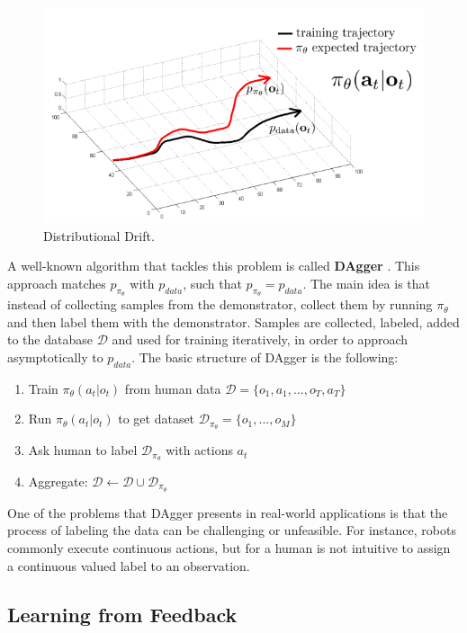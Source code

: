 \begin{figure}[H]
    \centering
    \includegraphics[width=0.7\linewidth]{imagenes/cap1/drift.png}
    \caption{Distributional Drift.\protect\footnotemark}
    \label{fig:drift}
\end{figure}

A well-known algorithm that tackles this problem is called \textbf{DAgger} \cite{ross2011reduction}. This approach matches $p_{\pi_{\theta}}$ with $p_{data}$, such that $p_{\pi_{\theta}} = p_{data}$. The main idea is that instead of collecting samples from the demonstrator, collect them by running $\pi_{\theta}$ and then label them with the demonstrator. Samples are collected, labeled, added to the database $\mathcal{D}$ and used for training iteratively, in order to approach asymptotically to $p_{data}$. The basic structure of DAgger is the following:

\begin{enumerate}
    \item Train $\pi_{\theta}(a_{t}|o_{t})$ from human data $\mathcal{D}=\{o_{1},a_{1},...,o_{T},a_{T}\}$
    \item Run $\pi_{\theta}(a_{t}|o_{t})$ to get dataset $\mathcal{D}_{\pi_{\theta}}=\{o_{1},...,o_{M}\}$
    \item Ask human to label $\mathcal{D}_{\pi_{\theta}}$ with actions $a_{t}$
    \item Aggregate: $\mathcal{D} \leftarrow \mathcal{D} \cup \mathcal{D_{\pi_{\theta}}}$
\end{enumerate}

One of the problems that DAgger presents in real-world applications is that the process of labeling the data can be challenging or unfeasible. For instance, robots commonly execute continuous actions, but for a human is not intuitive to assign a continuous valued label to an observation.

\subsection{Learning from Feedback}


